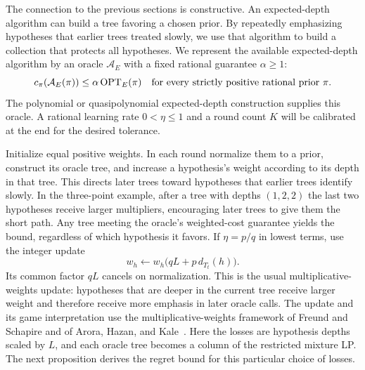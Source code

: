 The connection to the previous sections is constructive. An
expected-depth algorithm can build a tree favoring a chosen prior.
By repeatedly emphasizing hypotheses that earlier trees treated
slowly, we use that algorithm to build a collection that protects
all hypotheses. We represent the available expected-depth algorithm
by an oracle $\mathcal A_E$ with a fixed rational guarantee $\alpha\ge1$:
\begin{equation}\label{eq:randomized-oracle}
 c_\pi(\mathcal A_E(\pi))\le\alpha\operatorname{OPT}_E(\pi)
 \quad\text{for every strictly positive rational prior }\pi.
\end{equation}
The polynomial or quasipolynomial expected-depth construction supplies
this oracle. A rational learning rate $0<\eta\le1$ and a round count
$K$ will be calibrated at the end for the desired tolerance.

Initialize equal positive weights. In each round normalize them to a
prior, construct its oracle tree, and increase a hypothesis's weight
according to its depth in that tree. This directs later trees toward
hypotheses that earlier trees identify slowly. In the three-point
example, after a tree with depths $(1,2,2)$ the last two hypotheses
receive larger multipliers, encouraging later trees to give them
the short path. Any tree meeting the oracle's weighted-cost guarantee yields the bound,
regardless of which hypothesis it favors.
If $\eta=p/q$ in lowest terms, use the integer update
\begin{equation}\label{eq:randomized-integer-update}
 w_h\leftarrow w_h\bigl(qL+p\,d_{T_t}(h)\bigr).
\end{equation}
Its common factor $qL$ cancels on normalization. This is the usual
multiplicative-weights update: hypotheses that are deeper in the
current tree receive larger weight and therefore receive more emphasis
in later oracle calls. The update and its game interpretation use the
multiplicative-weights framework of Freund and Schapire and of Arora,
Hazan, and Kale~\cite{fs1999,ahk2012}. Here the losses are hypothesis
depths scaled by $L$, and each oracle tree becomes a column of the
restricted mixture LP. The next proposition derives the regret bound
for this particular choice of losses.

